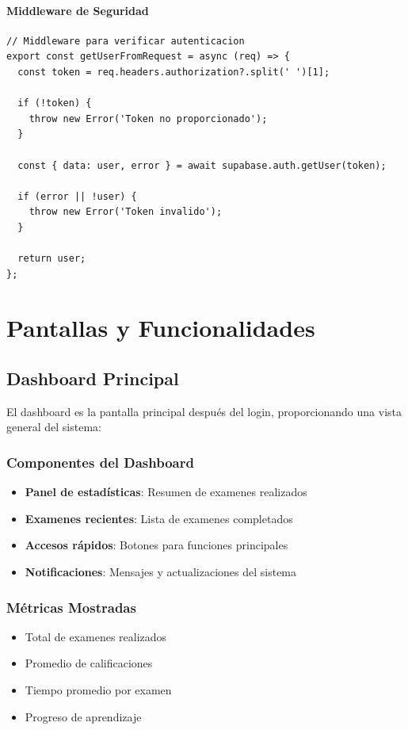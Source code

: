 \documentclass[12pt,a4paper]{report}
\begin{document}
\subsubsection{Middleware de Seguridad}
\begin{lstlisting}
// Middleware para verificar autenticacion
export const getUserFromRequest = async (req) => {
  const token = req.headers.authorization?.split(' ')[1];
  
  if (!token) {
    throw new Error('Token no proporcionado');
  }
  
  const { data: user, error } = await supabase.auth.getUser(token);
  
  if (error || !user) {
    throw new Error('Token invalido');
  }
  
  return user;
};
\end{lstlisting}

\chapter{Pantallas y Funcionalidades}

\section{Dashboard Principal}

El dashboard es la pantalla principal después del login, proporcionando una vista general del sistema:

\subsection{Componentes del Dashboard}
\begin{itemize}
    \item \textbf{Panel de estadísticas}: Resumen de examenes realizados
    \item \textbf{Examenes recientes}: Lista de examenes completados
    \item \textbf{Accesos rápidos}: Botones para funciones principales
    \item \textbf{Notificaciones}: Mensajes y actualizaciones del sistema
\end{itemize}

\subsection{Métricas Mostradas}
\begin{itemize}
    \item Total de examenes realizados
    \item Promedio de calificaciones
    \item Tiempo promedio por examen
    \item Progreso de aprendizaje
\end{itemize}
\end{document}
